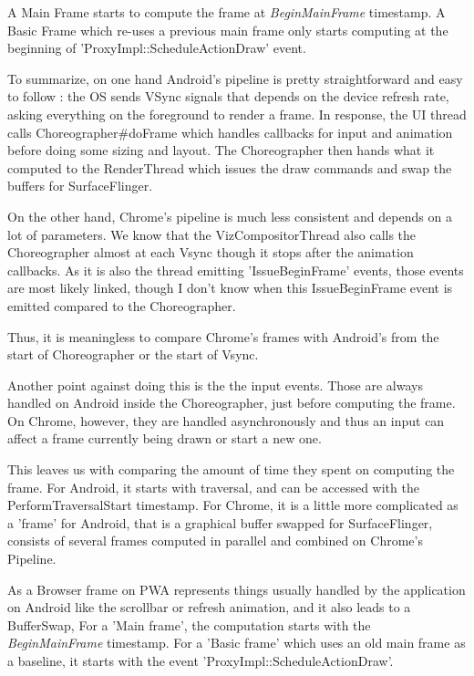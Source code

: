     \iffalse

A Main Frame starts to compute the frame at \textit{BeginMainFrame} timestamp. A Basic Frame which re-uses a previous main frame only starts computing at the beginning of 'ProxyImpl::ScheduleActionDraw' event. 

    To summarize, on one hand Android's pipeline is pretty straightforward and easy to follow : the OS sends VSync signals that depends on the device refresh rate, asking everything on the foreground to render a frame. In response, the UI thread calls Choreographer\#doFrame which handles callbacks for input and animation before doing some sizing and layout. The Choreographer then hands what it computed to the RenderThread which issues the draw commands and swap the buffers for SurfaceFlinger.


On the other hand, Chrome's pipeline is much less consistent and depends on a lot of parameters. We know that the VizCompositorThread also calls the Choreographer almost at each Vsync though it stops after the animation callbacks. As it is also the thread emitting 'IssueBeginFrame' events, those events are most likely linked, though I don't know when this IssueBeginFrame event is emitted compared to the Choreographer.

Thus, it is meaningless to compare Chrome's frames with Android's from the start of Choreographer or the start of Vsync.

Another point against doing this is the the input events. Those are always handled on Android inside the Choreographer, just before computing the frame. On Chrome, however, they are handled asynchronously and thus an input can affect a frame currently being drawn or start a new one.

This leaves us with comparing the amount of time they spent on computing the frame. For Android, it starts with traversal, and can be accessed with the PerformTraversalStart timestamp. For Chrome, it is a little more complicated as a 'frame' for Android, that is a graphical buffer swapped for SurfaceFlinger, consists of several frames computed in parallel and combined on Chrome's Pipeline. \newline

As a Browser frame on PWA represents things usually handled by the application on Android like the scrollbar or refresh animation, and it also leads to a BufferSwap, 
For a 'Main frame', the computation starts with the \textit{BeginMainFrame} timestamp. For a 'Basic frame' which uses an old main frame as a baseline, it starts with the event 'ProxyImpl::ScheduleActionDraw'. 

